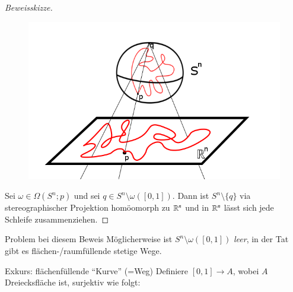 \documentclass[a4paper,10pt]{scrartcl}
\begin{document}
\begin{exs*}
\begin{enumerate}[(1)]
\begin{figure}[H]
\caption{}
\end{figure}
\begin{proof}[Beweisskizze]
\begin{figure}[H]
\centering
\includegraphics[scale=0.3]{fig59.png}
\caption{}
\end{figure}
 Sei $\omega \in \Omega(S^n;p)$ und sei $q\in S^n\setminus \omega([0,1])$. Dann ist $S^n\setminus\{q\}$ via stereographischer Projektion homöomorph zu $\mathbb{R}^n$ und in $\mathbb{R}^n$ lässt sich jede Schleife zusammenziehen.
\end{proof}
\begin{seg}{Problem bei diesem Beweis}
 Möglicherweise ist $S^n \setminus \omega([0,1])$ \emph{leer}, in der Tat gibt es flächen-/raumfüllende stetige Wege.
\end{seg}

\begin{seg}{Exkurs: flächenfüllende "`Kurve"' (=Weg)}
 Definiere $[0,1] \to A $, wobei $A$ Dreiecksfläche ist, surjektiv wie folgt:


\end{seg}
\end{enumerate}
\end{exs*}
\end{document}
